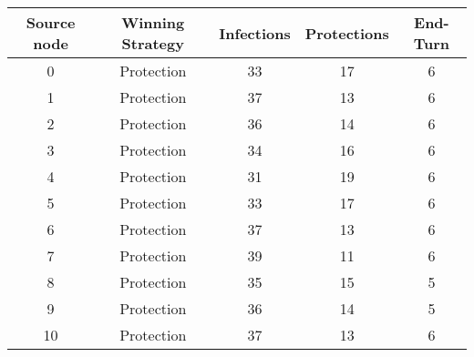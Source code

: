 \documentclass[results.tex]{subfiles}
\begin{document}
    \begin{center}
        \begin{tabular}{| c || c | c | c | c |}
            \hline
            {\bfseries Source node} & {\bfseries Winning Strategy} & {\bfseries Infections} & {\bfseries Protections}
            & {\bfseries End-Turn}
            \\  %
            \hline\hline
            0                       & Protection                   & 33                     & 17                      & 6                    \\
            \hline
            1                       & Protection                   & 37                     & 13                      & 6                    \\
            \hline
            2                       & Protection                   & 36                     & 14                      & 6                    \\
            \hline
            3                       & Protection                   & 34                     & 16                      & 6                    \\
            \hline
            4                       & Protection                   & 31                     & 19                      & 6                    \\
            \hline
            5                       & Protection                   & 33                     & 17                      & 6                    \\
            \hline
            6                       & Protection                   & 37                     & 13                      & 6                    \\
            \hline
            7                       & Protection                   & 39                     & 11                      & 6                    \\
            \hline
            8                       & Protection                   & 35                     & 15                      & 5                    \\
            \hline
            9                       & Protection                   & 36                     & 14                      & 5                    \\
            \hline
            10                      & Protection                   & 37                     & 13                      & 6                    \\

\end{tabular}
\end{center}
\end{document}
